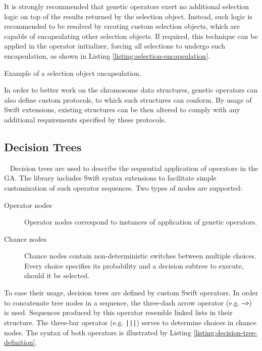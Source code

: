 It is strongly recommended that genetic operators exert no additional selection logic on top of the results returned by the selection object. Instead, such logic is recommended to be resolved by creating custom selection objects, which are capable of encapsulating other selection objects. If required, this technique can be applied in the operator initializer, forcing all selections to undergo such encapsulation, as shown in Listing \ref{listing:selection-encapsulation}.

\begin{listing}[ht]
	\caption{Example of a selection object encapsulation.}
	\label{listing:selection-encapsulation}
\end{listing}

In order to better work on the chromosome data structures, genetic operators can also define custom protocols, to which such structures can conform. By usage of Swift extensions, existing structures can be then altered to comply with any additional requirements specified by these protocols.

\subsection{Decision Trees}~\label{section:decision-trees}
Decision trees are used to describe the sequential application of operators in the GA. The library includes Swift syntax extensions to facilitate simple customization of such operator sequences. Two types of nodes are supported:
~
\begin{description}
	\item[Operator nodes]
	Operator nodes correspond to instances of application of genetic operators.

	\item[Chance nodes]
	Chance nodes contain non-deterministic switches between multiple choices. Every choice specifies its probability and a decision subtree to execute, should it be selected.
\end{description}

To ease their usage, decision trees are defined by custom Swift operators. In order to concatenate tree nodes in a sequence, the three-dash arrow operator (e.g. \texttt{--->}) is used. Sequences produced by this operator resemble linked lists in their structure. The three-bar operator (e.g. \texttt{|||}) serves to determine choices in chance nodes. The syntax of both operators is illustrated by Listing \ref{listing:decision-tree-definition}.

